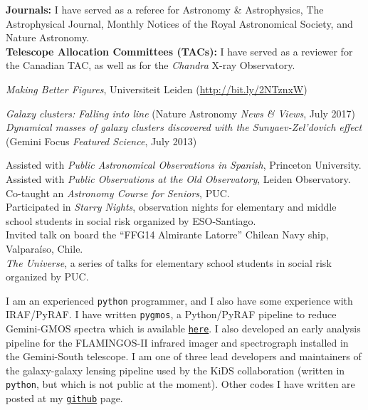 \documentclass[11pt]{article}
\begin{document}
\noindent 
\textbf{Journals:} I have served as a referee for Astronomy \& Astrophysics, The Astrophysical Journal, Monthly Notices of the Royal 
    Astronomical Society, and Nature Astronomy.\\
\noindent
\textbf{Telescope Allocation Committees (TACs):} I have served as a reviewer for the Canadian TAC, as well as for the
    \textit{Chandra} X-ray Observatory.


\noindent
{} \emph{Making Better Figures}, Universiteit Leiden (\url{http://bit.ly/2NTznxW})


\noindent
\emph{Galaxy clusters: Falling into line} (Nature Astronomy \emph{News \& Views}, July 2017)\\
\emph{Dynamical masses of galaxy clusters discovered with the Sunyaev-Zel'dovich effect} (Gemini Focus \emph{Featured Science}, July 2013)


\noindent
{} Assisted with \emph{Public Astronomical Observations in Spanish}, Princeton University.\\
 Assisted with \emph{Public Observations at the Old Observatory}, Leiden Observatory.\\
 Co-taught an \emph{Astronomy Course for Seniors}, PUC.\\
 Participated in \emph{Starry Nights}, observation nights for elementary and middle school students in social risk organized by ESO-Santiago.\\
 Invited talk on board the ``FFG14 Almirante Latorre'' Chilean Navy ship, Valpara\'iso, Chile.\\
 \emph{The Universe}, a series of talks for elementary school students in social risk organized by PUC.\\



I am an experienced \texttt{python} programmer, and I also have some experience with IRAF/PyRAF. I have written {\tt pygmos}, a Python/PyRAF pipeline to reduce Gemini-GMOS spectra which is available \href{https://github.com/cristobal-sifon/pygmos/}{\texttt{here}}. I also developed an early analysis pipeline for the FLAMINGOS-II infrared imager and spectrograph installed in the Gemini-South telescope. I am one of three lead developers and maintainers of the galaxy-galaxy lensing pipeline used by the KiDS collaboration (written in \texttt{python}, but which is not public at the moment). Other codes I have written are posted at my \href{https://github.com/cristobal-sifon}{\texttt{github}} page.\\
\end{document}
